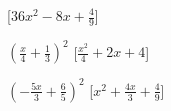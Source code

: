 \begin{esercizio}
\begin{multicols}{2}
\begin{enumeratea}
  \hfill [\(36 x^{2} - 8 x + \frac{4}{9}\)]
\item \(\left(\frac{x}{4} + \frac{1}{3}\right)^{2}\)
  \hfill [\(\frac{x^{2}}{4} + 2 x + 4\)]
\item \(\left(- \frac{5 x}{3} + \frac{6}{5}\right)^{2}\)
  \hfill [\(x^{2} + \frac{4 x}{3} + \frac{4}{9}\)]
\end{enumeratea}
\end{multicols}
\end{esercizio}

